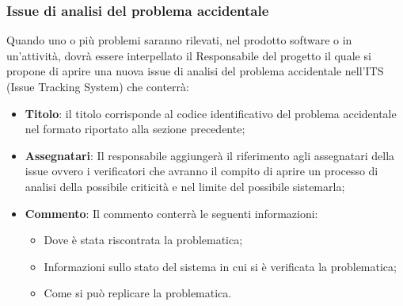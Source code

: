         \subsubsection{Issue di analisi del problema accidentale}
            Quando uno o più problemi saranno rilevati, nel prodotto software o in un'attività, dovrà essere interpellato il Responsabile del progetto il quale si propone di aprire una nuova issue di analisi del problema accidentale nell'ITS (Issue Tracking System) che conterrà:
            \begin{itemize}
                \item\textbf{Titolo}: il titolo corrisponde al codice identificativo del problema accidentale nel formato riportato alla sezione precedente;
                \item\textbf{Assegnatari}: Il responsabile aggiungerà il riferimento agli assegnatari della issue ovvero i verificatori che avranno il compito di aprire un processo di analisi della possibile criticità e nel limite del possibile sistemarla;
                \item\textbf{Commento}: Il commento conterrà le seguenti informazioni:
                    \begin{itemize}
                        \item Dove è stata riscontrata la problematica;
                        \item Informazioni sullo stato del sistema in cui si è verificata la problematica;
                        \item Come si può replicare la problematica.
                    \end{itemize}                
            \end{itemize}    
